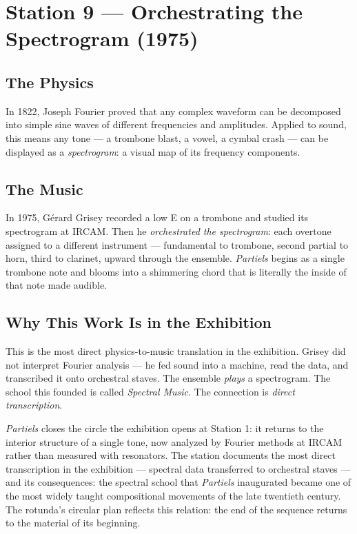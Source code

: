 \documentclass[11pt]{article}
\begin{document}
\section{Station 9 --- Orchestrating the Spectrogram (1975)}

\subsection{The Physics}
In 1822, Joseph Fourier proved that any complex waveform can be decomposed into simple sine
waves of different frequencies and amplitudes. Applied to sound, this means any tone --- a
trombone blast, a vowel, a cymbal crash --- can be displayed as a \emph{spectrogram}: a
visual map of its frequency components.

\subsection{The Music}
In 1975, G\'erard Grisey recorded a low E on a trombone and studied its spectrogram at IRCAM.
Then he \emph{orchestrated the spectrogram}: each overtone assigned to a different instrument
--- fundamental to trombone, second partial to horn, third to clarinet, upward through the
ensemble. \emph{Partiels} begins as a single trombone note and blooms into a shimmering chord
that is literally the inside of that note made audible.

\subsection{Why This Work Is in the Exhibition}
This is the most direct physics-to-music translation in the exhibition. Grisey did not
interpret Fourier analysis --- he fed sound into a machine, read the data, and transcribed it
onto orchestral staves. The ensemble \emph{plays} a spectrogram. The school this founded is
called \emph{Spectral Music}. The connection is \emph{direct transcription}.

\emph{Partiels} closes the circle the exhibition opens at Station 1: it returns to the
interior structure of a single tone, now analyzed by Fourier methods at IRCAM rather than
measured with resonators. The station documents the most direct transcription in the
exhibition --- spectral data transferred to orchestral staves --- and its consequences: the
spectral school that \emph{Partiels} inaugurated became one of the most widely taught
compositional movements of the late twentieth century. The rotunda's circular plan reflects
this relation: the end of the sequence returns to the material of its beginning.
\end{document}
